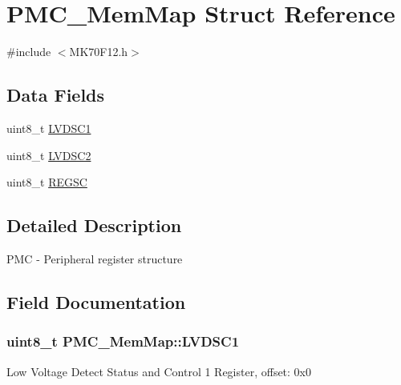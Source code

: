 \hypertarget{struct_p_m_c___mem_map}{}\section{P\+M\+C\+\_\+\+Mem\+Map Struct Reference}
\label{struct_p_m_c___mem_map}


{\ttfamily \#include $<$M\+K70\+F12.\+h$>$}

\subsection*{Data Fields}
\begin{DoxyCompactItemize}
\item 
uint8\+\_\+t \hyperlink{struct_p_m_c___mem_map_aeed619ce4a5bf17bff6201b02deebb54}{L\+V\+D\+S\+C1}
\item 
uint8\+\_\+t \hyperlink{struct_p_m_c___mem_map_a934db8b39dae8b99a9a9165df50145f5}{L\+V\+D\+S\+C2}
\item 
uint8\+\_\+t \hyperlink{struct_p_m_c___mem_map_aa14a55a46cc237589d6c01ebf7676c2a}{R\+E\+G\+S\+C}
\end{DoxyCompactItemize}


\subsection{Detailed Description}
P\+M\+C -\/ Peripheral register structure 

\subsection{Field Documentation}
\hypertarget{struct_p_m_c___mem_map_aeed619ce4a5bf17bff6201b02deebb54}{}
\subsubsection[{L\+V\+D\+S\+C1}]{\setlength{\rightskip}{0pt plus 5cm}uint8\+\_\+t P\+M\+C\+\_\+\+Mem\+Map\+::\+L\+V\+D\+S\+C1}\label{struct_p_m_c___mem_map_aeed619ce4a5bf17bff6201b02deebb54}
Low Voltage Detect Status and Control 1 Register, offset\+: 0x0 \hypertarget{struct_p_m_c___mem_map_a934db8b39dae8b99a9a9165df50145f5}{}
